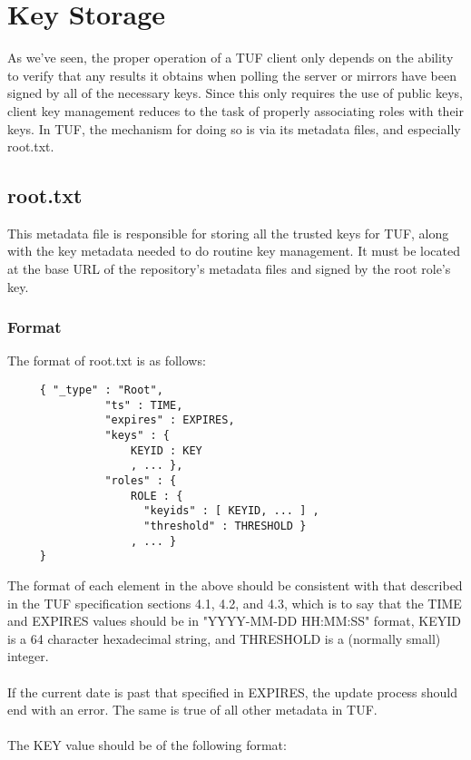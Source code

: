 \documentclass{article}
\begin{document}
\section{Key Storage}
As we've seen, the proper operation of a TUF client only depends on the ability to 
verify that any results it obtains when polling the server or mirrors have been 
signed by all of the necessary keys. Since this only requires the use of public 
keys, client key management reduces to the task of properly associating roles 
with their keys. In TUF, the mechanism for doing so is via its metadata files, and
especially root.txt.

\subsection{root.txt}
This metadata file is responsible for storing all the trusted keys for TUF, 
along with the key metadata needed to do routine key management. It must be 
located at the base URL of the repository's metadata files and signed by the 
root role's key.

\subsubsection{Format}
The format of root.txt is as follows:

\begin{verbatim}
     { "_type" : "Root",
               "ts" : TIME,
               "expires" : EXPIRES,
               "keys" : {
                   KEYID : KEY
                   , ... },
               "roles" : {
                   ROLE : {
                     "keyids" : [ KEYID, ... ] ,
                     "threshold" : THRESHOLD }
                   , ... }
     }
\end{verbatim}

The format of each element in the above should be consistent with that described
in the TUF specification sections 4.1, 4.2, and 4.3, which is to say that the
TIME and EXPIRES values should be in "YYYY-MM-DD HH:MM:SS" format, KEYID is a
64 character hexadecimal string, and THRESHOLD is a (normally small) integer.
\\\\
If the current date is past that specified in EXPIRES, the update process should
end with an error. The same is true of all other metadata in TUF.
\\\\
The KEY value should be of the following format:
\end{document}
